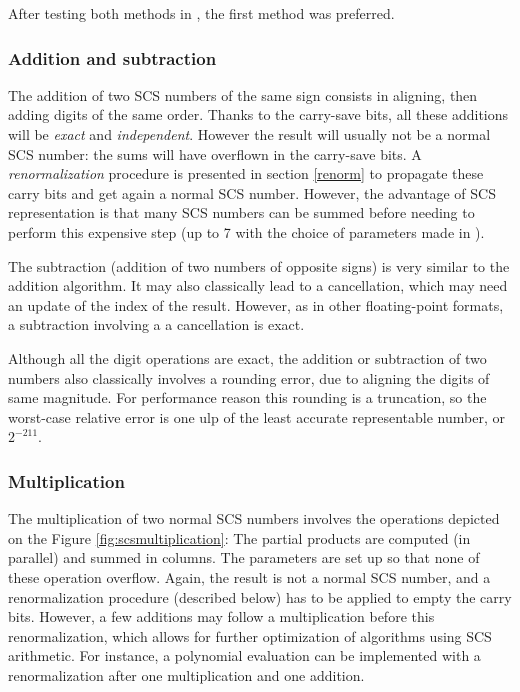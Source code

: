 After testing both methods in \crlibm, the first method was preferred.


\subsubsection{Addition and subtraction}

The addition of two SCS numbers of the same sign consists in aligning,
then adding digits of the same order. Thanks to the carry-save bits,
all these additions will be \emph{exact} and \emph{independent}.
However the result will usually not be a normal SCS number: the sums
will have overflown in the carry-save bits. A \emph{renormalization}
procedure is presented in section \ref{renorm} to propagate these
carry bits and get again a normal SCS number.  However, the advantage
of SCS representation is that many SCS numbers can be summed before
needing to perform this expensive step (up to 7 with the choice of
parameters made in \crlibm).

The subtraction (addition of two numbers of opposite signs) is very
similar to the addition algorithm. It may also classically lead to a
cancellation, which may need an update of the index of the result.
However, as in other floating-point formats, a subtraction involving a
a cancellation is exact.

Although all the digit operations are exact, the addition or
subtraction of two numbers also classically involves a rounding error,
due to aligning the digits of same magnitude. For performance reason
this rounding is a truncation, so the worst-case relative error is one
ulp of the least accurate representable number, or $2^{-211}$.




\subsubsection{Multiplication}

The multiplication of two normal SCS numbers involves the operations
depicted on the Figure \ref{fig:scsmultiplication}: The partial
products are computed (in parallel) and summed in columns. The
parameters are set up so that none of these operation overflow. Again,
the result is not a normal SCS number, and a renormalization procedure
(described below) has to be applied to empty the carry bits. However,
a few additions may follow a multiplication before this
renormalization, which allows for further optimization of algorithms
using SCS arithmetic. For instance, a polynomial evaluation can be
implemented with a renormalization after one multiplication and one
addition.

